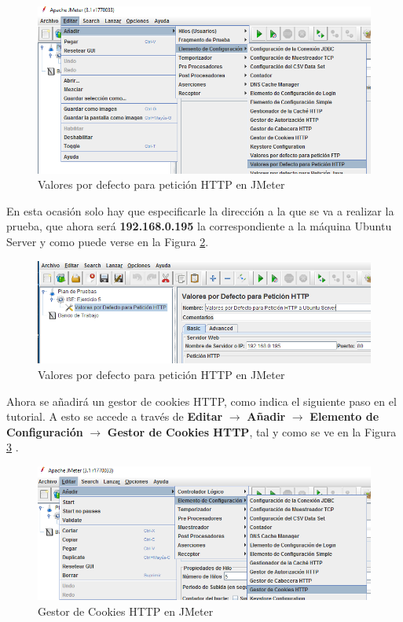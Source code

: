 \begin{figure}[H] %
	\centering
	\includegraphics[scale=0.7]{figuras/ejercicio4/figura4-4.png} 
	\caption{Valores por defecto para petición HTTP en JMeter} 
	\label{fig:figura4-4}
\end{figure}

En esta ocasión solo hay que especificarle la dirección a la que se va a realizar la prueba, que ahora será \textbf{192.168.0.195} la correspondiente a la máquina Ubuntu Server y como puede verse en la Figura \ref{fig:figura4-5}.

\begin{figure}[H] %
	\centering
	\includegraphics[scale=0.7]{figuras/ejercicio4/figura4-5.png} 
	\caption{Valores por defecto para petición HTTP en JMeter} 
	\label{fig:figura4-5}
\end{figure}

Ahora se añadirá un gestor de cookies HTTP, como indica el siguiente paso en el tutorial. A esto se accede a través de \textbf{Editar} $ \rightarrow $ \textbf{Añadir} $ \rightarrow $ \textbf{Elemento de Configuración} $ \rightarrow $ \textbf{Gestor de Cookies HTTP}, tal y como se ve en la Figura \ref{fig:figura4-6} .

\begin{figure}[H] %
	\centering
	\includegraphics[scale=0.7]{figuras/ejercicio4/figura4-6.png} 
	\caption{Gestor de Cookies HTTP en JMeter} 
	\label{fig:figura4-6}
\end{figure}


